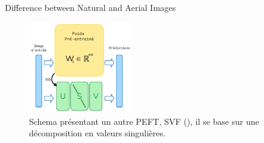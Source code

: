 \begin{subsectionframemod}{Difference between Natural and Aerial Images}

    \begin{figure}
        \includegraphics[width=0.4\textwidth]{Figures/svf.png}
        \caption{Schema présentant un autre PEFT, SVF (\cite{sun2022singular}), il se base sur une décomposition en valeurs singulières.}
    \end{figure}


\end{subsectionframemod}
